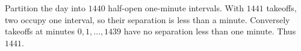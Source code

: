 Partition the day into $1440$ half-open one-minute intervals. With $1441$ takeoffs, two occupy one interval, so their separation is less than a minute. Conversely takeoffs at minutes $0,1,\ldots,1439$ have no separation less than one minute. Thus $\boxed{1441}$.
